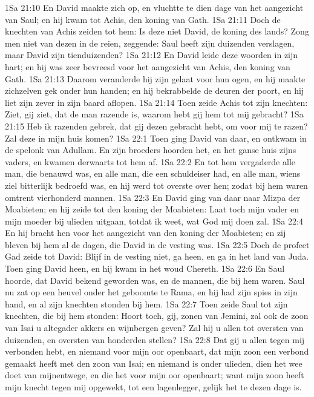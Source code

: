 1Sa 21:10  En David maakte zich op, en vluchtte te dien dage van het aangezicht van Saul; en hij kwam tot Achis, den koning van Gath.
1Sa 21:11  Doch de knechten van Achis zeiden tot hem: Is deze niet David, de koning des lands? Zong men niet van dezen in de reien, zeggende: Saul heeft zijn duizenden verslagen, maar David zijn tienduizenden?
1Sa 21:12  En David leide deze woorden in zijn hart; en hij was zeer bevreesd voor het aangezicht van Achis, den koning van Gath.
1Sa 21:13  Daarom veranderde hij zijn gelaat voor hun ogen, en hij maakte zichzelven gek onder hun handen; en hij bekrabbelde de deuren der poort, en hij liet zijn zever in zijn baard aflopen.
1Sa 21:14  Toen zeide Achis tot zijn knechten: Ziet, gij ziet, dat de man razende is, waarom hebt gij hem tot mij gebracht?
1Sa 21:15  Heb ik razenden gebrek, dat gij dezen gebracht hebt, om voor mij te razen? Zal deze in mijn huis komen?
1Sa 22:1  Toen ging David van daar, en ontkwam in de spelonk van Adullam. En zijn broeders hoorden het, en het ganse huis zijns vaders, en kwamen derwaarts tot hem af.
1Sa 22:2  En tot hem vergaderde alle man, die benauwd was, en alle man, die een schuldeiser had, en alle man, wiens ziel bitterlijk bedroefd was, en hij werd tot overste over hen; zodat bij hem waren omtrent vierhonderd mannen.
1Sa 22:3  En David ging van daar naar Mizpa der Moabieten; en hij zeide tot den koning der Moabieten: Laat toch mijn vader en mijn moeder bij ulieden uitgaan, totdat ik weet, wat God mij doen zal.
1Sa 22:4  En hij bracht hen voor het aangezicht van den koning der Moabieten; en zij bleven bij hem al de dagen, die David in de vesting was.
1Sa 22:5  Doch de profeet Gad zeide tot David: Blijf in de vesting niet, ga heen, en ga in het land van Juda. Toen ging David heen, en hij kwam in het woud Chereth.
1Sa 22:6  En Saul hoorde, dat David bekend geworden was, en de mannen, die bij hem waren. Saul nu zat op een heuvel onder het geboomte te Rama, en hij had zijn spies in zijn hand, en al zijn knechten stonden bij hem.
1Sa 22:7  Toen zeide Saul tot zijn knechten, die bij hem stonden: Hoort toch, gij, zonen van Jemini, zal ook de zoon van Isai u altegader akkers en wijnbergen geven? Zal hij u allen tot oversten van duizenden, en oversten van honderden stellen?
1Sa 22:8  Dat gij u allen tegen mij verbonden hebt, en niemand voor mijn oor openbaart, dat mijn zoon een verbond gemaakt heeft met den zoon van Isai; en niemand is onder ulieden, dien het wee doet van mijnentwege, en die het voor mijn oor openbaart; want mijn zoon heeft mijn knecht tegen mij opgewekt, tot een lagenlegger, gelijk het te dezen dage is.
